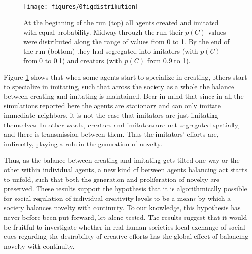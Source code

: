 \documentclass[a4paper,12pt,man,british]{apa6}
\begin{document}
\begin{figure}%
 \vspace{1\baselineskip} 
\centering 
\texttt{[image: figures/0figdistribution]}
\caption{At the beginning of the run (top) all agents created and imitated with equal probability. Midway through the run their $p(C)$ values were distributed along the range of values from 0 to 1. By the end of the run (bottom) they had segregated into imitators (with $p(C)$ from 0 to 0.1) and creators (with $p(C)$ from 0.9 to 1).}
\label{fig:0figdistribution}
\end{figure}

Figure \ref{fig:0figdistribution} shows that when some agents start to specialize in creating, others start to specialize in imitating, such that across the society as a whole the balance between creating and imitating is maintained. Bear in mind that since in all the simulations reported here the agents are stationary and can only imitate immediate neighbors, it is not the case that imitators are just imitating themselves. In other words, creators and imitators are not segregated spatially, and there is transmission between them. Thus the imitators' efforts are, indirectly, playing a role in the generation of novelty. 

Thus, as the balance between creating and imitating gets tilted one way or the other within individual agents, a new kind of between agents balancing act starts to unfold, such that both the generation and proliferation of novelty are preserved. 
These results support the hypothesis that it is algorithmically possible for social regulation of individual creativity levels to be a means by which a society balances novelty with continuity. To our knowledge, this hypothesis has never before been put forward, let alone tested. The results suggest that it would be fruitful to investigate whether in real human societies local exchange of social cues regarding the desirability of creative efforts has the global effect of balancing novelty with continuity. 
\end{document}

